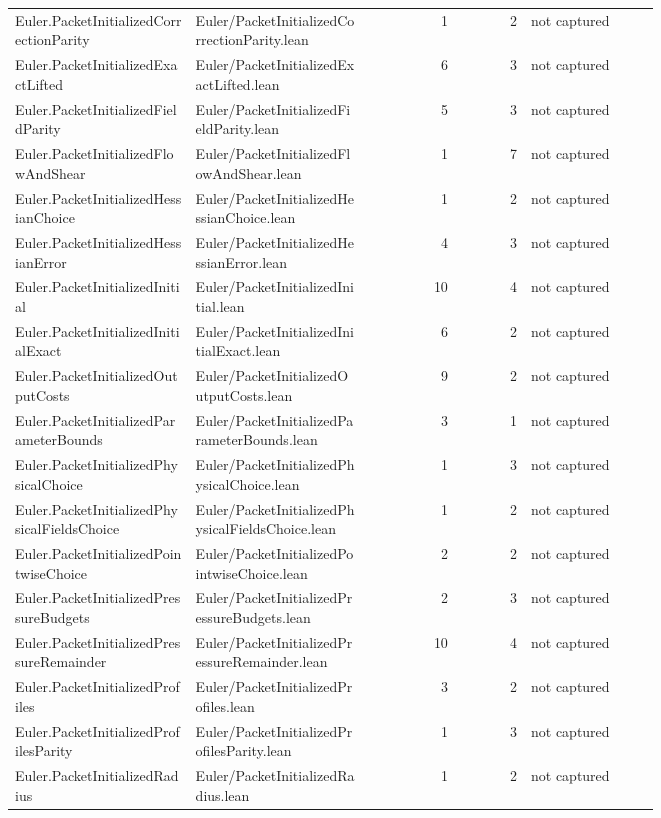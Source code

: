 \documentclass[10pt]{article}
\begin{document}
\begin{longtable}{p{0.28\linewidth}p{0.27\linewidth}r r p{0.20\linewidth}}
Euler.PacketInitializedCorrectionParity & Euler/PacketInitializedCorrectionParity.lean & 1 & 2 & not captured\\
Euler.PacketInitializedExactLifted & Euler/PacketInitializedExactLifted.lean & 6 & 3 & not captured\\
Euler.PacketInitializedFieldParity & Euler/PacketInitializedFieldParity.lean & 5 & 3 & not captured\\
Euler.PacketInitializedFlowAndShear & Euler/PacketInitializedFlowAndShear.lean & 1 & 7 & not captured\\
Euler.PacketInitializedHessianChoice & Euler/PacketInitializedHessianChoice.lean & 1 & 2 & not captured\\
Euler.PacketInitializedHessianError & Euler/PacketInitializedHessianError.lean & 4 & 3 & not captured\\
Euler.PacketInitializedInitial & Euler/PacketInitializedInitial.lean & 10 & 4 & not captured\\
Euler.PacketInitializedInitialExact & Euler/PacketInitializedInitialExact.lean & 6 & 2 & not captured\\
Euler.PacketInitializedOutputCosts & Euler/PacketInitializedOutputCosts.lean & 9 & 2 & not captured\\
Euler.PacketInitializedParameterBounds & Euler/PacketInitializedParameterBounds.lean & 3 & 1 & not captured\\
Euler.PacketInitializedPhysicalChoice & Euler/PacketInitializedPhysicalChoice.lean & 1 & 3 & not captured\\
Euler.PacketInitializedPhysicalFieldsChoice & Euler/PacketInitializedPhysicalFieldsChoice.lean & 1 & 2 & not captured\\
Euler.PacketInitializedPointwiseChoice & Euler/PacketInitializedPointwiseChoice.lean & 2 & 2 & not captured\\
Euler.PacketInitializedPressureBudgets & Euler/PacketInitializedPressureBudgets.lean & 2 & 3 & not captured\\
Euler.PacketInitializedPressureRemainder & Euler/PacketInitializedPressureRemainder.lean & 10 & 4 & not captured\\
Euler.PacketInitializedProfiles & Euler/PacketInitializedProfiles.lean & 3 & 2 & not captured\\
Euler.PacketInitializedProfilesParity & Euler/PacketInitializedProfilesParity.lean & 1 & 3 & not captured\\
Euler.PacketInitializedRadius & Euler/PacketInitializedRadius.lean & 1 & 2 & not captured\\

\end{longtable}
\end{document}
